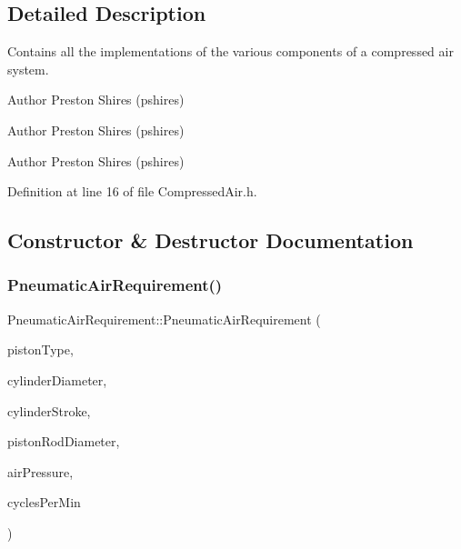 \subsection{Detailed Description}
Contains all the implementations of the various components of a compressed air system. 

\begin{DoxyAuthor}{Author}
Preston Shires (pshires) 
\end{DoxyAuthor}


\begin{DoxyAuthor}{Author}
Preston Shires (pshires) 
\end{DoxyAuthor}


\begin{DoxyAuthor}{Author}
Preston Shires (pshires) 
\end{DoxyAuthor}


Definition at line 16 of file Compressed\+Air.\+h.



\subsection{Constructor \& Destructor Documentation}
\mbox{\label{class_pneumatic_air_requirement_a1255612b8467e69471c097c94eabcf69}} 
\subsubsection{\texorpdfstring{Pneumatic\+Air\+Requirement()}{PneumaticAirRequirement()}\hspace{0.1cm}{\footnotesize\ttfamily [1/6]}}
{\footnotesize\ttfamily Pneumatic\+Air\+Requirement\+::\+Pneumatic\+Air\+Requirement (\begin{DoxyParamCaption}\item[{Piston\+Type}]{piston\+Type,  }\item[{double}]{cylinder\+Diameter,  }\item[{double}]{cylinder\+Stroke,  }\item[{double}]{piston\+Rod\+Diameter,  }\item[{double}]{air\+Pressure,  }\item[{double}]{cycles\+Per\+Min }\end{DoxyParamCaption})}

